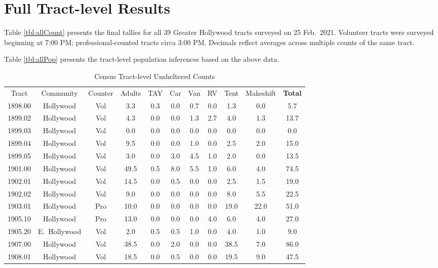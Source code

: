 \documentclass[11pt,twocolumn]{article}
\begin{document}
\section{Full Tract-level Results}

Table \ref{tbl:allCount} presents the final tallies for all 39 Greater Hollywood tracts surveyed 
on 25 Feb.~2021. Volunteer tracts were surveyed beginning at 7:00 PM; professional-counted tracts 
circa 3:00 PM. Decimals reflect averages across multiple counts of the same tract.

Table \ref{tbl:allPop} presents the tract-level population inferences based on the above data. 

\begin{table}[t]
\caption{Census Tract-level Unsheltered Counts}
\centering
\begin{tabular}{ccccccccccc}
\toprule
Tract & Community & Counter & Adults & TAY & Car & Van & RV & Tent & Makeshift & {\bf Total} \\ \cmidrule{1-11}
1898.00 & Hollywood & Vol &  3.3 &  0.3 &  0.0 &  0.7 &  0.0 &  1.3 &  0.0 &   5.7 \\
1899.02 & Hollywood & Vol &  4.3 &  0.0 &  0.0 &  1.3 &  2.7 &  4.0 &  1.3 &  13.7 \\
1899.03 & Hollywood & Vol &  0.0 &  0.0 &  0.0 &  0.0 &  0.0 &  0.0 &  0.0 &   0.0 \\
1899.04 & Hollywood & Vol &  9.5 &  0.0 &  0.0 &  1.0 &  0.0 &  2.5 &  2.0 &  15.0 \\
1899.05 & Hollywood & Vol &  3.0 &  0.0 &  3.0 &  4.5 &  1.0 &  2.0 &  0.0 &  13.5 \\
1901.00 & Hollywood & Vol & 49.5 &  0.5 &  8.0 &  5.5 &  1.0 &  6.0 &  4.0 &  74.5 \\
1902.01 & Hollywood & Vol & 14.5 &  0.0 &  0.5 &  0.0 &  0.0 &  2.5 &  1.5 &  19.0 \\
1902.02 & Hollywood & Vol &  9.0 &  0.0 &  0.0 &  0.0 &  0.0 &  8.0 &  5.5 &  22.5 \\
1903.01 & Hollywood & Pro & 10.0 &  0.0 &  0.0 &  0.0 &  0.0 & 19.0 & 22.0 &  51.0 \\
1905.10 & Hollywood & Pro & 13.0 &  0.0 &  0.0 &  0.0 &  4.0 &  6.0 &  4.0 &  27.0 \\
1905.20 & E.~Hollywood & Vol &  2.0 &  0.5 &  0.5 &  1.0 &  0.0 &  4.0 &  1.0 &   9.0 \\
1907.00 & Hollywood & Vol & 38.5 &  0.0 &  2.0 &  0.0 &  0.0 & 38.5 &  7.0 &  86.0 \\
1908.01 & Hollywood & Vol & 18.5 &  0.0 &  0.5 &  0.0 &  0.0 & 19.5 &  9.0 &  47.5 \\

\end{tabular}
\end{table}
\end{document}
